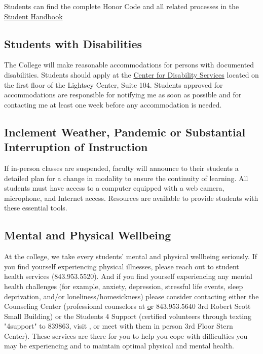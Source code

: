 \vspace{0.10in}
\noindent Students can find the complete Honor Code and all related processes in the \href{http://studentaffairs.cofc.edu/honor-system/studenthandbook/index.php}{Student Handbook} 

\subsection{Students with
Disabilities}\label{students-with-disabilities}

The College will make reasonable accommodations for persons with
documented disabilities. Students should apply at the
\href{http://disabilityservices.cofc.edu}{Center for Disability
Services} located on the first floor of the Lightsey Center, Suite 104.
Students approved for accommodations are responsible for notifying me as
soon as possible and for contacting me at least one week before any
accommodation is needed.

\subsection{Inclement Weather, Pandemic or Substantial Interruption of Instruction}

If in-person classes are suspended, faculty will announce to their students a detailed plan for a change in modality to ensure the continuity of learning. All students must have access to a computer equipped with a web camera, microphone, and Internet access. Resources are available to provide students with these essential tools.


\subsection{Mental and Physical Wellbeing}

At the college, we take every students’ mental and physical wellbeing seriously. If you find yourself experiencing physical illnesses, please reach out to student health services (843.953.5520). And if you find yourself experiencing any mental health challenges (for example, anxiety, depression, stressful life events, sleep deprivation, and/or loneliness/homesickness) please consider contacting either the Counseling Center (professional counselors at \href{http://counseling.cofc.edu} or 843.953.5640 3rd Robert Scott Small Building) or the Students 4 Support (certified volunteers through texting "4support" to 839863, visit \href{http://counseling.cofc.edu/cct/index.php}, or meet with them in person 3rd Floor Stern Center).  These services are there for you to help you cope with difficulties you may be experiencing and to maintain optimal physical and mental health.

